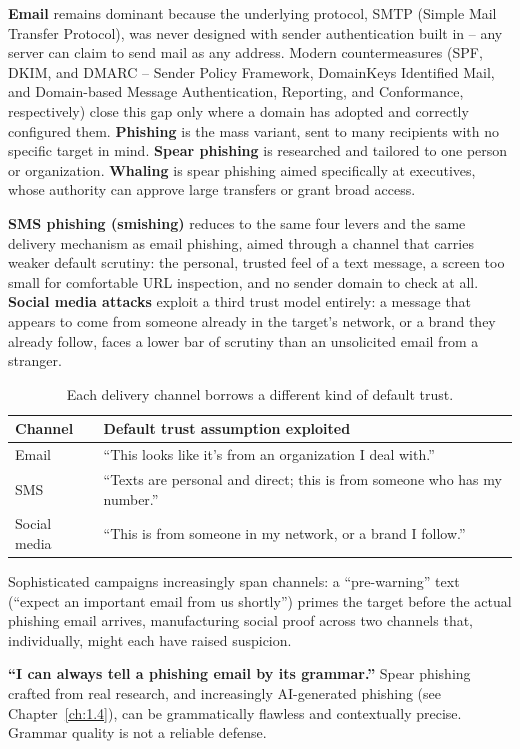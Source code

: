 \textbf{Email} remains dominant because the underlying protocol, SMTP (Simple Mail Transfer
Protocol), was never designed with sender authentication built in -- any server can claim to send
mail as any address. Modern countermeasures (SPF, DKIM, and DMARC -- Sender Policy Framework,
DomainKeys Identified Mail, and Domain-based Message Authentication, Reporting, and Conformance,
respectively) close this gap only where a domain has adopted and correctly configured them.
\textbf{Phishing} is the mass variant, sent to many recipients with no specific target in mind.
\textbf{Spear phishing} is researched and tailored to one person or organization. \textbf{Whaling}
is spear phishing aimed specifically at executives, whose authority can approve large transfers or
grant broad access.

\textbf{SMS phishing (smishing)} reduces to the same four levers and the same delivery mechanism as
email phishing, aimed through a channel that carries weaker default scrutiny: the personal, trusted
feel of a text message, a screen too small for comfortable URL inspection, and no sender domain to
check at all. \textbf{Social media attacks} exploit a third trust model entirely: a message that
appears to come from someone already in the target's network, or a brand they already follow, faces
a lower bar of scrutiny than an unsolicited email from a stranger.

\begin{table}[h]
\centering
\begin{tabular}{@{}ll@{}}
\toprule
Channel & Default trust assumption exploited \\
\midrule
Email & ``This looks like it's from an organization I deal with.'' \\
SMS & ``Texts are personal and direct; this is from someone who has my number.'' \\
Social media & ``This is from someone in my network, or a brand I follow.'' \\
\bottomrule
\end{tabular}
\caption{Each delivery channel borrows a different kind of default trust.}
\end{table}

Sophisticated campaigns increasingly span channels: a ``pre-warning'' text (``expect an important
email from us shortly'') primes the target before the actual phishing email arrives, manufacturing
social proof across two channels that, individually, might each have raised suspicion.

\begin{misconception}
\textbf{``I can always tell a phishing email by its grammar.''} Spear phishing crafted from real
research, and increasingly AI-generated phishing (see Chapter~\ref{ch:1.4}), can be
grammatically flawless and contextually precise. Grammar quality is not a reliable defense.
\end{misconception}


